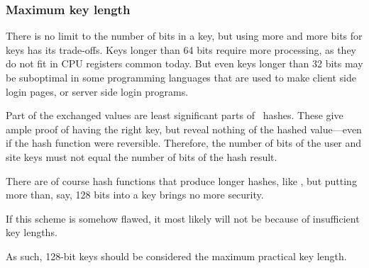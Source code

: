 \subsubsection{Maximum key length}
There is no limit to the number of bits in a key,
but using more and more bits for keys has its trade-offs.
Keys longer than 64 bits require more processing,
as they do not fit in CPU registers common today.
But even keys longer than 32 bits may be suboptimal in some programming languages that are used to make client side login pages,
or server side login programs.
\par
Part of the exchanged values are least significant parts of \SHA\ hashes.
These give ample proof of having the right key,
but reveal nothing of the hashed value---even if the hash function were reversible.
Therefore,
the number of bits of the user and site keys must not equal the number of bits of the hash result.
\par
There are of course hash functions that produce longer hashes,
like ,
but putting more than,
say,
128 bits into a key brings no more security.
\begin{moafu}
If this scheme is somehow flawed,
it most likely will not be because of insufficient key lengths.
\end{moafu}
As such,
128-bit keys should be considered the maximum practical key length.
